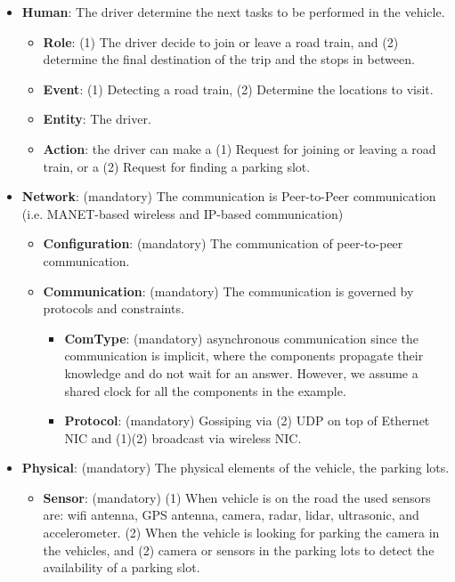 \begin{itemize}
\begin{itemize}
\begin{itemize}
        \end{itemize}
        \item \checkmark \textbf{Human}: The driver determine the next tasks to be performed in the vehicle.
        \begin{itemize}
            \item \checkmark \textbf{Role}: (1) The driver decide to join or leave a road train, and (2) determine the final destination of the trip and the stops in between.
            \item \checkmark \textbf{Event}: (1) Detecting a road train, (2) Determine the locations to visit. 
            \item \textbf{Entity}: The driver.
            \item \checkmark \textbf{Action}: the driver can make a (1) Request for joining or leaving a road train, or a (2) Request for finding a parking slot. 
        \end{itemize}
        \item \checkmark \textbf{Network}: (mandatory) The communication is Peer-to-Peer communication (i.e. MANET-based wireless and IP-based communication)
        \begin{itemize}
            \item \checkmark \textbf{Configuration}: (mandatory) The communication of peer-to-peer communication. %
            \item \checkmark \textbf{Communication}: (mandatory) The communication is governed by protocols and constraints.
            \begin{itemize}
                \item \checkmark \textbf{ComType}: %
                (mandatory) asynchronous communication since the communication is implicit, where the components propagate their knowledge and do not wait for an answer. However, we assume a shared clock for all the components in the example.
                \item \checkmark \textbf{Protocol}: (mandatory) Gossiping via (2) UDP on top of Ethernet NIC and (1)(2) broadcast via wireless NIC.  
            \end{itemize}
        \end{itemize}
        \item \checkmark \textbf{Physical}: (mandatory) The physical elements of the vehicle, the parking lots.
        \begin{itemize}
            \item \checkmark \textbf{Sensor}: (mandatory) (1) When vehicle is on the road the used sensors are: wifi antenna, GPS antenna, camera, radar, lidar, ultrasonic, and accelerometer. (2) When the vehicle is looking for parking the camera in the vehicles, and (2) camera or sensors in the parking lots to detect the availability of a parking slot.  

\end{itemize}
\end{itemize}
\end{itemize}
